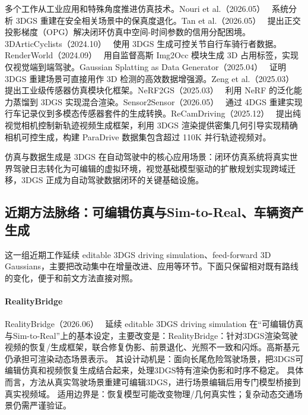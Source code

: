 多个工作从工业应用和特殊角度推进仿真技术。Nouri et al.（2026.05）~\cite{2605_01995} 系统分析 3DGS 重建在安全相关场景中的保真度退化。Tan et al.（2026.05）~\cite{2605_21032} 提出正交投影梯度（OPG）解决闭环仿真中空间-时间参数的信用分配困境。3DArticCyclists（2024.10）~\cite{2410_10782} 使用 3DGS 生成可控关节自行车骑行者数据。RenderWorld（2024.09）~\cite{2409_11356} 用自监督高斯 Img2Occ 模块生成 3D 占用标签，实现仅视觉端到端驾驶。Gaussian Splatting as Data Generator（2025.04）~\cite{2504_16740} 证明 3DGS 重建场景可直接用作 3D 检测的高效数据增强源。Zeng et al.（2025.03）~\cite{2503_11731} 提出工业级传感器仿真模块化框架。NeRF2GS（2025.03）~\cite{2503_09464} 利用 NeRF 的泛化能力蒸馏到 3DGS 实现混合渲染。Sensor2Sensor（2026.05）~\cite{2605_22809} 通过 4DGS 重建实现行车记录仪到多模态传感器套件的生成转换。ReCamDriving（2025.12）~\cite{2512_03621} 提出纯视觉相机控制新轨迹视频生成框架，利用 3DGS 渲染提供密集几何引导实现精确相机可控生成，构建 ParaDrive 数据集包含超过 110K 并行轨迹视频对。

\begin{takeaway}
仿真与数据生成是 3DGS 在自动驾驶中的核心应用场景：闭环仿真系统将真实世界驾驶日志转化为可编辑的虚拟环境，视觉基础模型驱动的扩散规划实现跨域迁移，3DGS 正成为自动驾驶数据闭环的关键基础设施。
\end{takeaway}


\subsection{近期方法脉络：可编辑仿真与Sim-to-Real、车辆资产生成}

这一组近期工作延续 editable 3DGS driving simulation、feed-forward 3D Gaussians，主要把改动集中在增量改进、应用等环节。下面只保留相对既有路线的变化，便于和前文方法直接对照。

\paragraph{RealityBridge}
RealityBridge（2026.06）~\cite{2606_16278} 延续 editable 3DGS driving simulation 在“可编辑仿真与Sim-to-Real”上的基本设定，主要改变是：RealityBridge：针对3DGS渲染驾驶视频的恢复/生成框架，联合修复伪影、前景退化、光照不一致和闪烁。高斯基元仍承担可渲染动态场景表示。
其设计动机是：面向长尾危险驾驶场景，把3DGS可编辑仿真和视频恢复生成结合起来，处理3DGS特有渲染伪影和时序不稳定。
具体而言，方法从真实驾驶场景重建可编辑3DGS，进行场景编辑后用专门模型桥接到真实视频域。
适用边界是：恢复模型可能改变物理/几何真实性；复杂动态交通场景仍需严谨验证。

